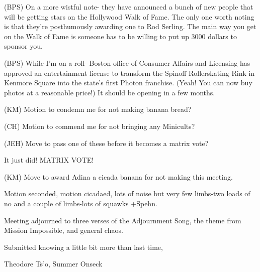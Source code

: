\documentclass[12pt]{article}
\begin{document}
(BPS) On a more wistful note- they have announced a bunch of new people that will be getting stars on the Hollywood Walk of Fame. The only one worth noting is that they're posthumously awarding one to Rod Serling. The main way you get on the Walk of Fame is someone has to be willing to put up 3000 dollars to sponsor you.

(BPS) While I'm on a roll- Boston office of Consumer Affairs and Licensing has approved an entertainment license to transform the Spinoff Rollerskating Rink in Kenmore Square into the state's first Photon franchise. (Yeah! You can now buy photos at a reasonable price!) It should be opening in a few months.

(KM) Motion to condemn me for not making banana bread?

(CH) Motion to commend me for not bringing any Minicults?

(JEH) Move to pass one of these before it becomes a matrix vote?

It just did! MATRIX VOTE!

(KM) Move to award Adina a cicada banana for not making this meeting.

Motion seconded, motion cicadaed, lots of noise but very few limbs-two loads of no and a couple of limbs-lots of squawks +Spehn.

\vspace{12pt}

\noindent
Meeting adjourned to three verses of the Adjournment Song, the theme from Mission Impossible, and general chaos.

\vspace{18pt}

\centerline{Submitted knowing a little bit more than last time,}
\centerline{Theodore Ts'o, Summer Onseck}
\end{document}
